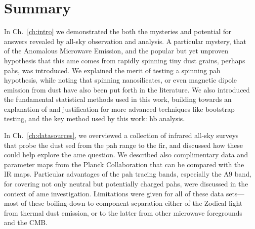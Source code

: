 \chapter{Summary}
  \label{ch:Summary}

  In Ch.~\ref{ch:intro} we demonstrated the both the mysteries and potential for answers revealed by all-sky observation and analysis. A particular mystery, that of the Anomalous Microwave Emission, and the popular but yet unproven hypothesis that this \acrshort{ame} comes from rapidly spinning tiny dust grains, perhaps \acrshort{pah}s, was introduced. We explained the merit of testing a spinning \acrshort{pah} hypothesis, while noting that spinning nanosilicates, or even magnetic dipole emission from dust have also been put forth in the literature. We also introduced the fundamental statistical methods used in this work, building towards an explanation of and justification for more advanced techniques like bootstrap testing, and the key method used by this work: \acrlong{hb} analysis.

  In Ch.~\ref{ch:datasources}, we overviewed a collection of infrared all-sky surveys that probe the dust \acrshort{sed} from the \acrshort{pah} range to the \acrshort{fir}, and discussed how these could help explore the \acrshort{ame} question. We described also complimentary data and parameter maps from the Planck Collaboration that can be compared with the IR maps. Particular advantages of the \acrshort{pah} tracing bands, especially the A9 band, for covering not only neutral but potentially charged \acrshort{pah}s, were discussed in the context of \acrshort{ame} investigation. Limitations were given for all of these data sets--- most of these boiling-down to component separation either of the Zodical light from thermal dust emission, or to the latter from other microwave foregrounds and the CMB.

